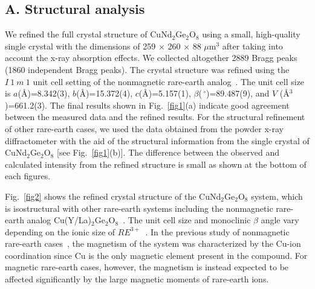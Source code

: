 \documentclass[aps,prl,reprint,amsmath,amssymb,superscriptaddress,showpacs]{revtex4-1}
\begin{document}
\subsection{A. Structural analysis}
We refined the full crystal structure of CuNd$_2$Ge$_2$O$_8$ using a small, high-quality single crystal with the dimensions of 259 $\times$ 260 $\times$ 88 $\mu$m$^3$ after taking into account the x-ray absorption effects. We collected altogether 2889 Bragg peaks (1860 independent Bragg peaks). The crystal structure was refined using the $I~1~m~1$ unit cell setting of the nonmagnetic rare-earth analog~\cite{H.Cho2017}. The unit cell size is $a$(\AA)=8.342(3), $b$(\AA)=15.372(4), $c$(\AA)=5.157(1), $\beta$($\,^{\circ}\mathrm{}$)=89.487(9), and $V$ (\AA$^3$)=661.2(3). The final results shown in Fig.~\ref{fig1}(a) indicate good agreement between the measured data and the refined results. For the structural refinement of other rare-earth cases, we used the data obtained from the powder x-ray diffractometer with the aid of the structural information from the single crystal of CuNd$_2$Ge$_2$O$_8$ [see Fig.~\ref{fig1}(b)]. The difference between the observed and calculated intensity from the refined structure is small as shown at the bottom of each figures. 

Fig.~\ref{fig2} shows the refined crystal structure of the CuNd$_2$Ge$_2$O$_8$ system, which is isostructural with other rare-earth systems including the nonmagnetic rare-earth analog Cu(Y/La)$_2$Ge$_2$O$_8$~\cite{H.Cho2017}. The unit cell size and monoclinic $\beta$ angle vary depending on the ionic size of $RE^{3+}$~\cite{U.Lambert1986}. In the previous study of nonmagnetic rare-earth cases~\cite{H.Cho2017}, the magnetism of the system was characterized by the Cu-ion coordination since Cu is the only magnetic element present in the compound. For magnetic rare-earth cases, however, the magnetism is instead expected to be affected significantly by the large magnetic moments of rare-earth ions.
\end{document}
